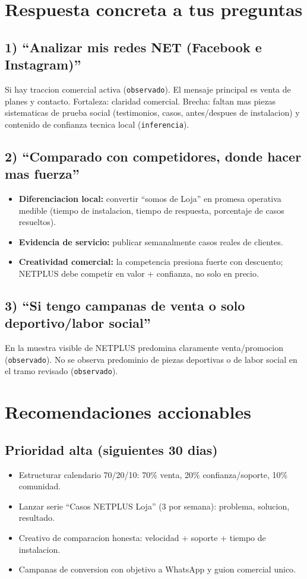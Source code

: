 \documentclass[9pt,a4paper,twocolumn,twoside]{tau-class/tau}
\begin{document}
\section{Respuesta concreta a tus preguntas}
\subsection*{1) ``Analizar mis redes NET (Facebook e Instagram)''}
Si hay traccion comercial activa (\texttt{observado}). El mensaje principal es venta de planes y contacto. Fortaleza: claridad comercial. Brecha: faltan mas piezas sistematicas de prueba social (testimonios, casos, antes/despues de instalacion) y contenido de confianza tecnica local (\texttt{inferencia}).

\subsection*{2) ``Comparado con competidores, donde hacer mas fuerza''}
\begin{itemize}
  \item \textbf{Diferenciacion local:} convertir ``somos de Loja'' en promesa operativa medible (tiempo de instalacion, tiempo de respuesta, porcentaje de casos resueltos).
  \item \textbf{Evidencia de servicio:} publicar semanalmente casos reales de clientes.
  \item \textbf{Creatividad comercial:} la competencia presiona fuerte con descuento; NETPLUS debe competir en valor + confianza, no solo en precio.
\end{itemize}

\subsection*{3) ``Si tengo campanas de venta o solo deportivo/labor social''}
En la muestra visible de NETPLUS predomina claramente venta/promocion (\texttt{observado}). No se observa predominio de piezas deportivas o de labor social en el tramo revisado (\texttt{observado}).

\section{Recomendaciones accionables}
\subsection*{Prioridad alta (siguientes 30 dias)}
\begin{itemize}
  \item Estructurar calendario 70/20/10: 70\% venta, 20\% confianza/soporte, 10\% comunidad.
  \item Lanzar serie ``Casos NETPLUS Loja'' (3 por semana): problema, solucion, resultado.
  \item Creativo de comparacion honesta: velocidad + soporte + tiempo de instalacion.
  \item Campanas de conversion con objetivo a WhatsApp y guion comercial unico.
\end{itemize}
\end{document}
